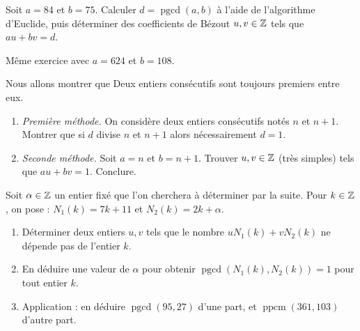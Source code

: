 \documentclass[11pt,class=report,crop=false]{standalone}
\newcommand{\pgcd}{\mathop{\mathrm{pgcd}}\nolimits}
\newcommand{\ppcm}{\mathop{\mathrm{ppcm}}\nolimits}
\begin{document}
    




\bigskip
\bigskip





\exercice{}
\enonce
Soit $a=84$ et $b=75$. Calculer $d=\pgcd(a,b)$ à l'aide de l'algorithme d'Euclide, puis déterminer des coefficients de Bézout $u,v \in \mathbb{Z}$ tels que $au+bv=d$.

Même exercice avec $a=624$ et $b=108$.
\finenonce

\finexercice




\exercice{}
\enonce
Nous allons montrer que \og{}Deux entiers consécutifs sont toujours premiers entre eux.\fg{}
\begin{enumerate}
    \item \emph{Première méthode.} On considère deux entiers consécutifs notés $n$ et $n+1$. Montrer que si $d$ divise $n$ et $n+1$ alors nécessairement $d=1$. 
    
    \item \emph{Seconde méthode.} Soit $a=n$ et $b=n+1$. Trouver $u,v \in \mathbb{Z}$ (très simples) tels que $au+bv=1$. Conclure.
\end{enumerate} 
\finenonce

\finexercice



\exercice{}
\enonce
Soit $\alpha \in \mathbb{Z}$ un entier fixé que l'on cherchera à déterminer par la suite. Pour $k \in \mathbb{Z}$, on pose : $N_1(k) = 7k+11$ et $N_2(k) = 2k + \alpha$.
\begin{enumerate}
    \item Déterminer deux entiers $u,v$ tels que le nombre $u N_1(k) + v N_2(k)$ ne dépende pas de l'entier $k$.
    
    \item En déduire une valeur de $\alpha$ pour obtenir $\pgcd(N_1(k) , N_2(k)) = 1$ pour tout entier $k$.
    
    \item Application : en déduire $\pgcd(95,27)$ d'une part, et $\ppcm(361,103)$ d'autre part.
\end{enumerate}
\finenonce


\finexercice
\end{document}
